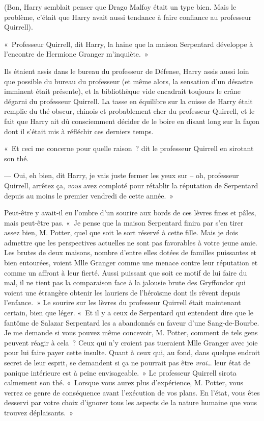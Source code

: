 (Bon, Harry semblait penser que Drago Malfoy était un type bien. Mais le problème, c'était que Harry avait aussi tendance à faire confiance au professeur Quirrell).

\later

«~Professeur Quirrell, dit Harry, la haine que la maison Serpentard développe à l'encontre de Hermione Granger m'inquiète.~»

Ils étaient assis dans le bureau du professeur de Défense, Harry assis aussi loin que possible du bureau du professeur (et même alors, la sensation d'un désastre imminent était présente), et la bibliothèque vide encadrait toujours le crâne dégarni du professeur Quirrell. La tasse en équilibre sur la cuisse de Harry était remplie du thé obscur, chinois et probablement cher du professeur Quirrell, et le fait que Harry ait dû consciemment décider de le boire en disant long sur la façon dont il s'était mis à réfléchir ces derniers temps.

«~Et ceci me concerne pour quelle raison~? dit le professeur Quirrell en sirotant son thé.

--- Oui, eh bien, dit Harry, je vais juste fermer les yeux sur -- oh, professeur Quirrell, arrêtez ça, \emph{vous} avez comploté pour rétablir la réputation de Serpentard depuis au moins le premier vendredi de cette année.~»

Peut-être y avait-il eu l'ombre d'un sourire aux bords de ces lèvres fines et pâles, mais peut-être pas. «~Je pense que la maison Serpentard finira par s'en tirer assez bien, M. Potter, quel que soit le sort réservé à cette fille. Mais je dois admettre que les perspectives actuelles ne sont pas favorables à votre jeune amie. Les brutes de deux maisons, nombre d'entre elles dotées de familles puissantes et bien entourées, voient Mlle Granger comme une menace contre leur réputation et comme un affront à leur fierté. Aussi puissant que soit ce motif de lui faire du mal, il ne tient pas la comparaison face à la jalousie brute des Gryffondor qui voient une étrangère obtenir les lauriers de l'héroïsme dont ils rêvent depuis l'enfance.~» Le sourire sur les lèvres du professeur Quirrell était maintenant certain, bien que léger. «~Et il y a ceux de Serpentard qui entendent dire que le fantôme de Salazar Serpentard les a abandonnés en faveur d'une Sang-de-Bourbe. Je me demande si vous pouvez même concevoir, M. Potter, comment de tels gens peuvent réagir à cela~? Ceux qui n'y croient pas tueraient Mlle Granger avec joie pour lui faire payer cette insulte. Quant à ceux qui, au fond, dans quelque endroit secret de leur esprit, se demandent si ça ne pourrait pas être \emph{vrai}… leur état de panique intérieure est à peine envisageable.~» Le professeur Quirrell sirota calmement son thé. «~Lorsque vous aurez plus d'expérience, M. Potter, vous verrez ce genre de conséquence avant l'exécution de vos plans. En l'état, vous êtes desservi par votre choix d'ignorer tous les aspects de la nature humaine que vous trouvez déplaisants.~»

